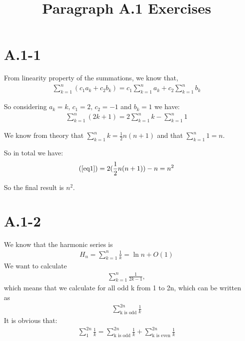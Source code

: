 \documentclass{article}
\title{Paragraph A.1 Exercises}
\begin{document}
\date{}
\author{}

\maketitle

\section*{A.1-1}
From linearity property of the summations, we know that,\begin{gather*}
    \sum_{k=1}^{n}{(c_{1}a_{k} + c_{2}b_{k})} = c_{1}\sum_{k=1}^{n}{a_{k}} + c_{2}\sum_{k=1}^{n}{b_{k}}
\end{gather*} 

So considering $a_{k} = k$, $c_{1} = 2$, $c_{2} = -1$ and $b_{k} = 1$ we have:
\begin{gather}
    \sum_{k=1}^{n}{(2k + 1)} = 2\sum_{k=1}^{n}{k} - \sum_{k=1}^{n}{1} \label{eq1}
\end{gather} 

We know from theory that $\sum_{k=1}^{n}{k} = \frac{1}{2}n(n+1)$ and that $\sum_{k=1}^{n}{1} = n$.

So in total we have:
\begin{gather*}
    (\ref{eq1}) = 2(\frac{1}{2}n(n+1)) - n = n^{2}
\end{gather*}

So the final result is $n^{2}$.

\section*{A.1-2}
We know that the harmonic series is 
\begin{gather*}
    H_{n} = \sum_{k=1}^{n}{\frac{1}{k}} = \ln{n} + O(1)
\end{gather*}
We want to calculate 
\begin{gather*}
    \sum_{k=1}^{n}{\frac{1}{2k-1}}, 
\end{gather*}    
which means that we calculate for all odd k from 1 to 2n, which can be written as 
\begin{gather*}
    \sum_{\text{k is odd}}^{2n}{\frac{1}{k}}
\end{gather*}
It is obvious that:
\begin{gather}
    \sum_{1}^{2n}{\frac{1}{k}} = \sum_{\text{k is odd}}^{2n}{\frac{1}{k}} + \sum_{\text{k is even}}^{2n}{\frac{1}{k}} \label{sum2}
\end{gather}
\end{document}
